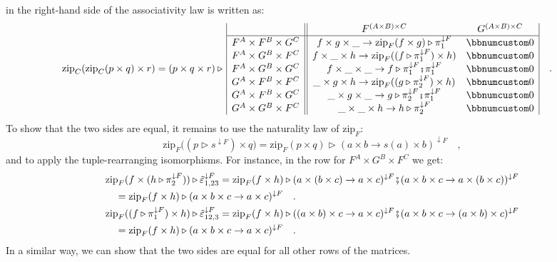 in the right-hand side of the associativity law is written as:
\begin{align*}
 & \text{zip}_{C}(\text{zip}_{C}(p\times q)\times r)=(p\times q\times r)\triangleright\,\begin{array}{|c||cc|}
 & F^{(A\times B)\times C} & G^{(A\times B)\times C}\\
\hline F^{A}\times F^{B}\times G^{C} & f\times g\times\_\rightarrow\text{zip}_{F}(f\times g)\triangleright\pi_{1}^{\downarrow F} & \bbnum 0\\
F^{A}\times G^{B}\times F^{C} & f\times\_\times h\rightarrow\text{zip}_{F}((f\triangleright\pi_{1}^{\downarrow F})\times h) & \bbnum 0\\
F^{A}\times G^{B}\times G^{C} & f\times\_\times\_\rightarrow f\triangleright\pi_{1}^{\downarrow F}\bef\pi_{1}^{\downarrow F} & \bbnum 0\\
G^{A}\times F^{B}\times F^{C} & \_\times g\times h\rightarrow\text{zip}_{F}((g\triangleright\pi_{2}^{\downarrow F})\times h) & \bbnum 0\\
G^{A}\times F^{B}\times G^{C} & \_\times g\times\_\rightarrow g\triangleright\pi_{2}^{\downarrow F}\bef\pi_{1}^{\downarrow F} & \bbnum 0\\
G^{A}\times G^{B}\times F^{C} & \_\times\_\times h\rightarrow h\triangleright\pi_{2}^{\downarrow F} & \bbnum 0
\end{array}\quad.
\end{align*}
 To show that the two sides are equal, it remains to use the naturality
law of $\text{zip}_{F}$:
\[
\text{zip}_{F}\big((p\triangleright s^{\downarrow F})\times q\big)=\text{zip}_{F}(p\times q)\triangleright(a\times b\rightarrow s(a)\times b)^{\downarrow F}\quad,
\]
and to apply the tuple-rearranging isomorphisms. For instance, in
the row for $F^{A}\times G^{B}\times F^{C}$ we get:
\begin{align*}
 & \text{zip}_{F}(f\times(h\triangleright\pi_{2}^{\downarrow F}))\triangleright\tilde{\varepsilon}_{1,23}^{\downarrow F}=\text{zip}_{F}(f\times h)\triangleright(a\times(b\times c)\rightarrow a\times c)^{\downarrow F}\bef(a\times b\times c\rightarrow a\times(b\times c))^{\downarrow F}\\
 & \quad=\text{zip}_{F}(f\times h)\triangleright(a\times b\times c\rightarrow a\times c)^{\downarrow F}\quad.\\
 & \text{zip}_{F}((f\triangleright\pi_{1}^{\downarrow F})\times h)\triangleright\tilde{\varepsilon}_{12,3}^{\downarrow F}=\text{zip}_{F}(f\times h)\triangleright((a\times b)\times c\rightarrow a\times c)^{\downarrow F}\bef(a\times b\times c\rightarrow(a\times b)\times c)^{\downarrow F}\\
 & \quad=\text{zip}_{F}(f\times h)\triangleright(a\times b\times c\rightarrow a\times c)^{\downarrow F}\quad.
\end{align*}
In a similar way, we can show that the two sides are equal for all
other rows of the matrices.

